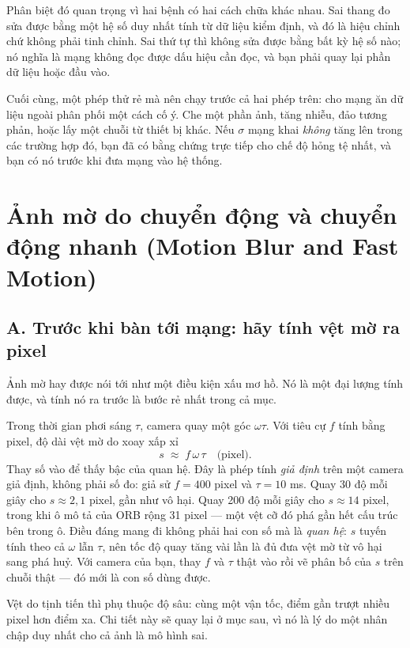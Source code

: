 \documentclass[../../deep_learning.tex]{subfiles}
\begin{document}
Phân biệt đó quan trọng vì hai bệnh có hai cách chữa khác nhau. Sai thang đo sửa được bằng một hệ số duy nhất tính từ dữ liệu kiểm định, và đó là hiệu chỉnh chứ không phải tinh chỉnh. Sai thứ tự thì không sửa được bằng bất kỳ hệ số nào; nó nghĩa là mạng không đọc được dấu hiệu cần đọc, và bạn phải quay lại phần dữ liệu hoặc đầu vào.

Cuối cùng, một phép thử rẻ mà nên chạy trước cả hai phép trên: cho mạng ăn dữ liệu ngoài phân phối một cách cố ý. Che một phần ảnh, tăng nhiễu, đảo tương phản, hoặc lấy một chuỗi từ thiết bị khác. Nếu \(\sigma\) mạng khai \emph{không} tăng lên trong các trường hợp đó, bạn đã có bằng chứng trực tiếp cho chế độ hỏng tệ nhất, và bạn có nó trước khi đưa mạng vào hệ thống.

\section{Ảnh mờ do chuyển động và chuyển động nhanh (Motion Blur and Fast Motion)}

\subsection{A. Trước khi bàn tới mạng: hãy tính vệt mờ ra pixel}

Ảnh mờ hay được nói tới như một điều kiện xấu mơ hồ. Nó là một đại lượng tính được, và tính nó ra trước là bước rẻ nhất trong cả mục.

Trong thời gian phơi sáng \(\tau\), camera quay một góc \(\omega\tau\). Với tiêu cự \(f\) tính bằng pixel, độ dài vệt mờ do xoay xấp xỉ
\[
s \;\approx\; f\,\omega\,\tau \quad\text{(pixel)} .
\]
Thay số vào để thấy bậc của quan hệ. Đây là phép tính \emph{giả định} trên một camera giả định, không phải số đo: giả sử \(f = 400\) pixel và \(\tau = 10\) ms. Quay 30 độ mỗi giây cho \(s \approx 2{,}1\) pixel, gần như vô hại. Quay 200 độ mỗi giây cho \(s \approx 14\) pixel, trong khi ô mô tả của ORB rộng 31 pixel --- một vệt cỡ đó phá gần hết cấu trúc bên trong ô. Điều đáng mang đi không phải hai con số mà là \emph{quan hệ}: \(s\) tuyến tính theo cả \(\omega\) lẫn \(\tau\), nên tốc độ quay tăng vài lần là đủ đưa vệt mờ từ vô hại sang phá huỷ. Với camera của bạn, thay \(f\) và \(\tau\) thật vào rồi vẽ phân bố của \(s\) trên chuỗi thật --- đó mới là con số dùng được.

Vệt do tịnh tiến thì phụ thuộc độ sâu: cùng một vận tốc, điểm gần trượt nhiều pixel hơn điểm xa. Chi tiết này sẽ quay lại ở mục sau, vì nó là lý do một nhân chập duy nhất cho cả ảnh là mô hình sai.
\end{document}
